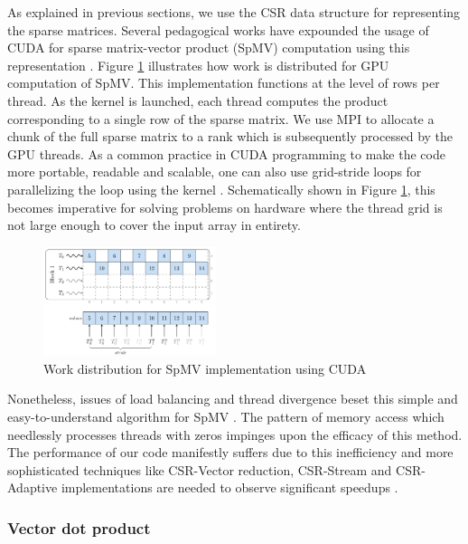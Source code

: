 \documentclass[sigplan,screen]{acmart}
\begin{document}
As explained in previous sections, we use the CSR data structure for representing the sparse matrices. Several pedagogical works have expounded the usage of CUDA for sparse matrix-vector product (SpMV) computation using this representation \cite{bell2008efficient, wang2010optimizing, spvm}. Figure \ref{spvm} illustrates how work is distributed for GPU computation of SpMV. This implementation functions at the level of rows per thread. As the kernel is launched, each thread computes the product corresponding to a single row of the sparse matrix. We use MPI to allocate a chunk of the full sparse matrix to a rank which is subsequently processed by the GPU threads. As a common practice in CUDA programming to make the code more portable, readable and scalable, one can also use grid-stride loops for parallelizing the loop using the kernel \cite{stride}. Schematically shown in Figure \ref{spvm}, this becomes imperative for solving problems on hardware where the thread grid is not large enough to cover the input array in entirety. 

\begin{figure}[h!]
	\begin{center}
		\includegraphics[width=0.45\textwidth]{plots/spvm.png}
	\end{center}
	\caption{Work distribution for SpMV implementation using CUDA \cite{spvm}}
	\label{spvm} 
\end{figure}

Nonetheless, issues of load balancing and thread divergence beset this simple and easy-to-understand algorithm for SpMV \cite{spvm}. The pattern of memory access which needlessly processes threads with zeros impinges upon the efficacy of this method. The performance of our code manifestly suffers due to this inefficiency and more sophisticated techniques like CSR-Vector reduction, CSR-Stream and CSR-Adaptive implementations are needed to observe significant speedups \cite{spvm}. 

\subsubsection{Vector dot product}\label{cuda_dot}
\end{document}
